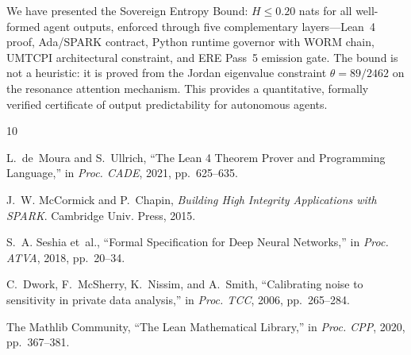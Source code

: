 \documentclass[sigconf,natbib=false]{acmart}
\begin{document}
We have presented the Sovereign Entropy Bound: $H \leq 0.20$ nats for all
well-formed agent outputs, enforced through five complementary layers---Lean~4
proof, Ada/SPARK contract, Python runtime governor with WORM chain, UMTCPI
architectural constraint, and ERE Pass~5 emission gate. The bound is not a
heuristic: it is proved from the Jordan eigenvalue constraint $\theta = 89/2462$
on the resonance attention mechanism. This provides a quantitative, formally
verified certificate of output predictability for autonomous agents.


\begin{thebibliography}{10}

L.~de~Moura and S.~Ullrich, ``The Lean 4 Theorem Prover and Programming
Language,'' in \emph{Proc. CADE}, 2021, pp.~625--635.

J.~W. McCormick and P.~Chapin, \emph{Building High Integrity Applications with
SPARK}. Cambridge Univ. Press, 2015.

S.~A. Seshia et~al., ``Formal Specification for Deep Neural Networks,'' in
\emph{Proc. ATVA}, 2018, pp.~20--34.

C.~Dwork, F.~McSherry, K.~Nissim, and A.~Smith, ``Calibrating noise to
sensitivity in private data analysis,'' in \emph{Proc. TCC}, 2006, pp.~265--284.

The Mathlib Community, ``The Lean Mathematical Library,'' in
\emph{Proc. CPP}, 2020, pp.~367--381.

\end{thebibliography}
\end{document}
